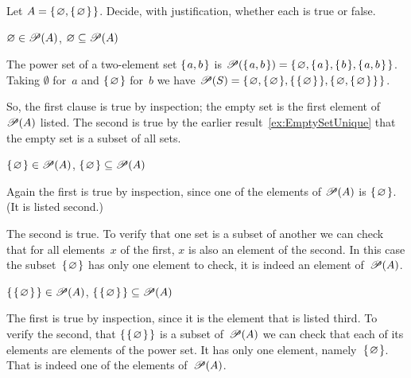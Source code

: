 \documentclass{ibl}  %
\begin{document}
\begin{problem}  
Let $A=\mbox{$\{\hspace{0.1em}\varnothing,\mbox{$\{\hspace{0.1em}\varnothing\hspace{0.1em}\}$}\hspace{0.1em}\}$}$.
Decide, with justification, whether each is true or false.
\begin{exes}
\begin{exercise} 
  $\varnothing\in\mathscr{P}(A)$, 
  $\varnothing\subseteq\mathscr{P}(A)$    
\end{exercise}
\begin{answer}
The power set of a two-element set $\mbox{$\{\hspace{0.1em}a,b\hspace{0.1em}\}$}$ is 
$\mathscr{P}(\mbox{$\{\hspace{0.1em}a,b\hspace{0.1em}\}$})=\mbox{$\{\hspace{0.1em}\varnothing,\mbox{$\{\hspace{0.1em}a\hspace{0.1em}\}$},\mbox{$\{\hspace{0.1em}b\hspace{0.1em}\}$},\mbox{$\{\hspace{0.1em}a,b\hspace{0.1em}\}$}\hspace{0.1em}\}$}$.
Taking $\emptyset$ for~$a$ and $\mbox{$\{\hspace{0.1em}\varnothing\hspace{0.1em}\}$}$ for~$b$ we have
$\mathscr{P}(S)=\mbox{$\{\hspace{0.1em}\varnothing, \mbox{$\{\hspace{0.1em}\varnothing\hspace{0.1em}\}$}, \mbox{$\{\hspace{0.1em}\mbox{$\{\hspace{0.1em}\varnothing\hspace{0.1em}\}$}\hspace{0.1em}\}$}, 
                   \mbox{$\{\hspace{0.1em}\varnothing, \mbox{$\{\hspace{0.1em}\varnothing\hspace{0.1em}\}$}\hspace{0.1em}\}$}\hspace{0.1em}\}$}$.

  So, the first clause is true by inspection; 
  the empty set is the first element
  of $\mathscr{P}(A)$ listed.
  The second is true by the earlier result~\ref{ex:EmptySetUnique}
  that the empty set is a subset of all sets.
\end{answer}
\begin{exercise} 
  $\mbox{$\{\hspace{0.1em}\varnothing\hspace{0.1em}\}$}\in\mathscr{P}(A)$, 
  $\mbox{$\{\hspace{0.1em}\varnothing\hspace{0.1em}\}$}\subseteq\mathscr{P}(A)$    
\end{exercise}
\begin{answer}
  Again the first is true by inspection, 
  since one of the elements of $\mathscr{P}(A)$ is 
  $\mbox{$\{\hspace{0.1em}\varnothing\hspace{0.1em}\}$}$.  (It is listed second.)

  The second is true.
  To verify that one set is a subset of another we can check that for all
  elements~$x$ of the first, $x$ is also an element of the second.
  In this case the subset~$\mbox{$\{\hspace{0.1em}\varnothing\hspace{0.1em}\}$}$ has only one element to check,
  it is indeed an element of~$\mathscr{P}(A)$.
\end{answer}
\begin{exercise} 
  $\mbox{$\{\hspace{0.1em}\mbox{$\{\hspace{0.1em}\varnothing\hspace{0.1em}\}$}\hspace{0.1em}\}$}\in\mathscr{P}(A)$,    
  $\mbox{$\{\hspace{0.1em}\mbox{$\{\hspace{0.1em}\varnothing\hspace{0.1em}\}$}\hspace{0.1em}\}$}\subseteq\mathscr{P}(A)$    
\end{exercise}
\begin{answer}
  The first is true by inspection, since it is the element that is listed
  third.
  To verify the second,
  that $\mbox{$\{\hspace{0.1em}\mbox{$\{\hspace{0.1em}\varnothing\hspace{0.1em}\}$}\hspace{0.1em}\}$}$ is a subset of~$\mathscr{P}(A)$
  we can check that each of its elements are elements of the power set.
  It has only one element, namely~$\mbox{$\{\hspace{0.1em}\varnothing\hspace{0.1em}\}$}$.
  That is indeed one of the elements of~$\mathscr{P}(A)$.   
\end{answer}
\end{exes}
\end{problem}
\end{document}
